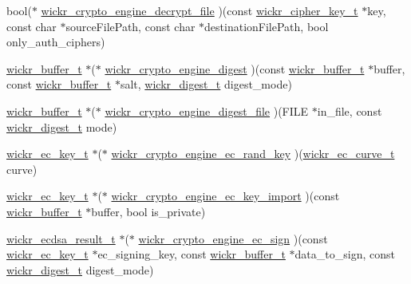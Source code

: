 \begin{DoxyCompactItemize}
\item 
bool($\ast$ \mbox{\hyperlink{group__wickr__crypto__engine_ga361b843efc839e30f90ce24c15b1dd27}{wickr\+\_\+crypto\+\_\+engine\+\_\+decrypt\+\_\+file}} )(const \mbox{\hyperlink{structwickr__cipher__key}{wickr\+\_\+cipher\+\_\+key\+\_\+t}} $\ast$key, const char $\ast$source\+File\+Path, const char $\ast$destination\+File\+Path, bool only\+\_\+auth\+\_\+ciphers)
\item 
\mbox{\hyperlink{structwickr__buffer}{wickr\+\_\+buffer\+\_\+t}} $\ast$($\ast$ \mbox{\hyperlink{group__wickr__crypto__engine_ga42dfc5b4df166616d962ee4c792ceaf4}{wickr\+\_\+crypto\+\_\+engine\+\_\+digest}} )(const \mbox{\hyperlink{structwickr__buffer}{wickr\+\_\+buffer\+\_\+t}} $\ast$buffer, const \mbox{\hyperlink{structwickr__buffer}{wickr\+\_\+buffer\+\_\+t}} $\ast$salt, \mbox{\hyperlink{structwickr__digest}{wickr\+\_\+digest\+\_\+t}} digest\+\_\+mode)
\item 
\mbox{\hyperlink{structwickr__buffer}{wickr\+\_\+buffer\+\_\+t}} $\ast$($\ast$ \mbox{\hyperlink{group__wickr__crypto__engine_ga298d2dea6722151c11e04458d3924823}{wickr\+\_\+crypto\+\_\+engine\+\_\+digest\+\_\+file}} )(F\+I\+LE $\ast$in\+\_\+file, const \mbox{\hyperlink{structwickr__digest}{wickr\+\_\+digest\+\_\+t}} mode)
\item 
\mbox{\hyperlink{structwickr__ec__key}{wickr\+\_\+ec\+\_\+key\+\_\+t}} $\ast$($\ast$ \mbox{\hyperlink{group__wickr__crypto__engine_gad16b229b7d16cf00d3983c277ee3b88b}{wickr\+\_\+crypto\+\_\+engine\+\_\+ec\+\_\+rand\+\_\+key}} )(\mbox{\hyperlink{structwickr__ec__curve}{wickr\+\_\+ec\+\_\+curve\+\_\+t}} curve)
\item 
\mbox{\hyperlink{structwickr__ec__key}{wickr\+\_\+ec\+\_\+key\+\_\+t}} $\ast$($\ast$ \mbox{\hyperlink{group__wickr__crypto__engine_ga87a069bbd3cdf509946e4ca0ca008f8f}{wickr\+\_\+crypto\+\_\+engine\+\_\+ec\+\_\+key\+\_\+import}} )(const \mbox{\hyperlink{structwickr__buffer}{wickr\+\_\+buffer\+\_\+t}} $\ast$buffer, bool is\+\_\+private)
\item 
\mbox{\hyperlink{structwickr__ecdsa__result}{wickr\+\_\+ecdsa\+\_\+result\+\_\+t}} $\ast$($\ast$ \mbox{\hyperlink{group__wickr__crypto__engine_gac5a36d2a53e06a75a2b818e6a5cc96a1}{wickr\+\_\+crypto\+\_\+engine\+\_\+ec\+\_\+sign}} )(const \mbox{\hyperlink{structwickr__ec__key}{wickr\+\_\+ec\+\_\+key\+\_\+t}} $\ast$ec\+\_\+signing\+\_\+key, const \mbox{\hyperlink{structwickr__buffer}{wickr\+\_\+buffer\+\_\+t}} $\ast$data\+\_\+to\+\_\+sign, const \mbox{\hyperlink{structwickr__digest}{wickr\+\_\+digest\+\_\+t}} digest\+\_\+mode)

\end{DoxyCompactItemize}
